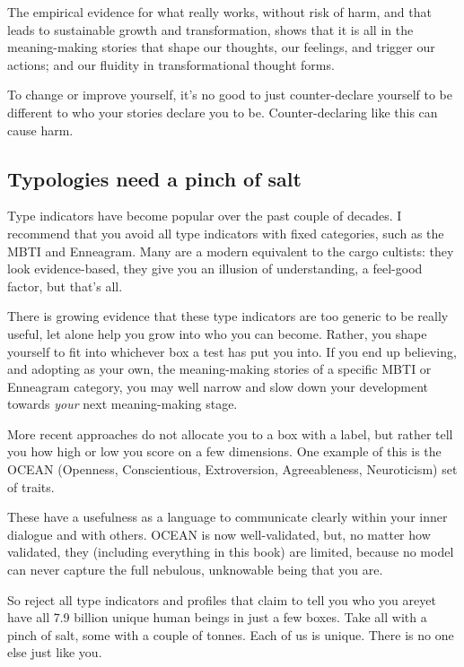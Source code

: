 The empirical evidence for what really works, without risk of harm, and that leads to sustainable growth and transformation, shows that it is all in the meaning\hyp{}making stories that shape our thoughts, our feelings, and trigger our actions; and our fluidity in transformational thought forms.


To change or improve yourself, it's no good to just counter-declare yourself to be different to who your stories declare you to be. Counter-declaring like this can cause harm. 
\subsection{Typologies need a pinch of salt}
\label{section:against-typologies}


Type indicators have become popular over the past couple of decades. I recommend that you avoid all type indicators with fixed categories, such as the MBTI and Enneagram. Many are a modern equivalent to the cargo cultists: they look evidence-based, they give you an illusion of understanding, a feel-good factor, but that's all. 


There is growing evidence that these type indicators are too generic to be really useful\cite{vermeren-undesired-popularity-of-typologies}, let alone help you grow into who you can become. Rather, you shape yourself to fit into whichever box a test has put you into. If you end up believing, and adopting as your own, the meaning\hyp{}making stories of a specific MBTI or Enneagram category, you may well narrow and slow down your development towards \emph{your} next meaning\hyp{}making stage.


More recent approaches do not allocate you to a box with a label, but rather tell you how high or low you score on a few dimensions. One example of this is the OCEAN (Openness, Conscientious, Extroversion, Agreeableness, Neuroticism) set of traits. 


These have a usefulness as a language to communicate clearly within your inner dialogue and with others. OCEAN is now well-validated, but, no matter how validated, they (including everything in this book) are limited, because no model can never capture the full nebulous, unknowable being that you are. 


So reject all type indicators and profiles that claim to tell you who you are\textemdash yet have all 7.9 billion unique human beings in just a few boxes. Take all with a pinch of salt, some with a couple of tonnes. Each of us is unique. There is no one else just like you. 




